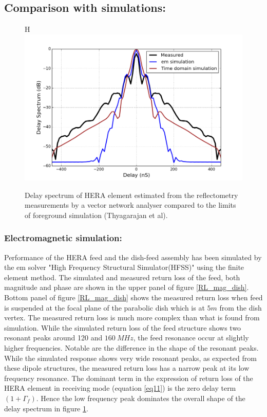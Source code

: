 \documentclass[twocolumn]{emulateapj}
\begin{document}
  \subsection{Comparison with simulations:}
  \begin{figure}{H}
  \centering
  \includegraphics[width=\linewidth]{GB_reflectometry_part3/plot/simulation_comparison2.png}
  \caption{Delay spectrum of HERA element estimated from the reflectometry measurements by a vector network analyser compared to the limits of foreground simulation (Thyagarajan et al).}
   \label{fig:sim_em}
   \end{figure}
 \subsubsection{Electromagnetic simulation:}  
 Performance of the HERA feed and the dish-feed assembly has been simulated by
    the em solver "High Frequency Structural Simulator(HFSS)" using the finite
    element method.  The simulated and measured return loss of the feed, both
    magnitude and phase are shown in the upper panel of figure
    \ref{RL_mag_dish}. Bottom panel of figure \ref{RL_mag_dish} shows the measured return loss when
    feed is suspended at the focal plane of the parabolic dish which is at $5m$
    from the dish vertex. The measured return loss is much more complex than what
    is found from simulation. 
    While the simulated return loss of the feed structure shows
    two resonant peaks around 120 and $160~MHz$, the feed resonance occur at
    slightly higher frequencies. Notable are the difference in the shape of the
    resonant peaks. While the simulated response shows very wide resonant peaks, as
    expected from these dipole structures, the measured return loss has
    a narrow peak at its low frequency resonance. The dominant term in the expression of  return loss of the HERA element in
    receiving mode (equation \ref{eq11}) is the zero delay term $(1+\Gamma_{f})$. Hence the low frequency peak dominates the overall shape of the delay spectrum in figure
    \ref{fig:sim_em}.\\
    
\end{document}
